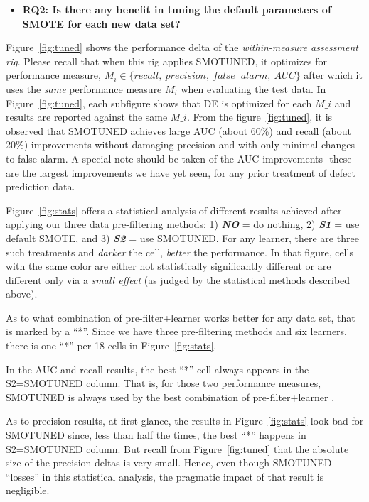 \documentclass[sigconf,review, anonymous]{acmart}
\newcommand{\bi}{\begin{itemize}[leftmargin=0.4cm]}
\newcommand{\ei}{\end{itemize}}
\theoremstyle{break}
\theoremstyle{break}
\newcommand{\sma}{{\sc SMOTE}}
\newcommand{\smb}{{\sc SMOTUNED}}
\begin{document}
\bi
\item {\bf RQ2: Is there any benefit in tuning the default parameters of SMOTE for each new data set?}
\ei

Figure~\ref{fig:tuned} shows the performance delta of the {\em within-measure assessment rig}.
Please recall that when this rig applies {\smb}, it optimizes for performance measure, $M_i \in \{recall,\ precision,\ false$ $\ alarm,\ AUC\}$
after which it uses the {\em same} performance measure
$M_i$ when evaluating the test data. In Figure~\ref{fig:tuned}, each subfigure shows that DE is optimized for each $M\_i$ and results are reported against the same $M\_i$.
From the figure~\ref{fig:tuned}, it is observed that
{\smb} achieves large AUC (about 60\%) and recall (about 20\%) improvements
without
 damaging precision and  with only minimal changes
 to false alarm. A special note should be taken of the AUC improvements- these are the largest improvements
 we have yet seen, for any prior treatment of defect prediction data.

Figure~\ref{fig:stats} offers a statistical analysis
of different results achieved
after applying our three data pre-filtering methods: 1) {\em \textbf{NO}} = do nothing, 2) {\em \textbf{S1}} = use default {\sma}, and 3) {\em \textbf{S2}} = use {\smb}.
For any learner, there are three such treatments and {\em darker} the cell, {\em better} the performance. 
In that figure, cells with the same color are
either not statistically significantly different or
are different only via a {\em small effect}
(as judged by the statistical methods described above).

As to what combination of pre-filter+learner works better for any data set, that is marked by a ``*''. Since we have three pre-filtering methods and six learners, there is one   ``*'' per 18 cells in Figure~\ref{fig:stats}.

In the  AUC and recall results,  the best ``*'' cell always appears in the S2={\smb} column. 
That is, for those two performance measures,  {\smb} is always
used by the best combination of pre-filter+learner .

As to precision  results,  at first glance, the  results in Figure~\ref{fig:stats} look bad for {\smb} since, less than half the times, 
the best ``*''  happens  in S2={\smb} column.
 But recall from Figure~\ref{fig:tuned} that the absolute size of the precision deltas is very small.  Hence, even though {\smb} ``losses'' in this statistical analysis, the pragmatic impact of that result  is  negligible.
 
\end{document}
